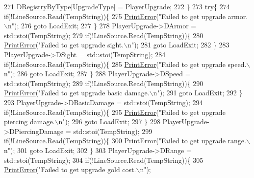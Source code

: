 \begin{DoxyCode}
{271         \hyperlink{classCPlayerUpgrade_a04673f65215501e9eb0ce7828091c30c}{DRegistryByType}[UpgradeType] = PlayerUpgrade;
272     \}
273     \textcolor{keywordflow}{try}\{
274         \textcolor{keywordflow}{if}(!LineSource.Read(TempString))\{
275             \hyperlink{Debug_8h_a2ed825eefefe35baf59a93a8c641323d}{PrintError}(\textcolor{stringliteral}{"Failed to get upgrade armor.\(\backslash\)n"});
276             \textcolor{keywordflow}{goto} LoadExit;
277         \}
278         PlayerUpgrade->DArmor = std::stoi(TempString);
279         \textcolor{keywordflow}{if}(!LineSource.Read(TempString))\{
280             \hyperlink{Debug_8h_a2ed825eefefe35baf59a93a8c641323d}{PrintError}(\textcolor{stringliteral}{"Failed to get upgrade sight.\(\backslash\)n"});
281             \textcolor{keywordflow}{goto} LoadExit;
282         \}
283         PlayerUpgrade->DSight = std::stoi(TempString);
284         \textcolor{keywordflow}{if}(!LineSource.Read(TempString))\{
285             \hyperlink{Debug_8h_a2ed825eefefe35baf59a93a8c641323d}{PrintError}(\textcolor{stringliteral}{"Failed to get upgrade speed.\(\backslash\)n"});
286             \textcolor{keywordflow}{goto} LoadExit;
287         \}
288         PlayerUpgrade->DSpeed = std::stoi(TempString);
289         \textcolor{keywordflow}{if}(!LineSource.Read(TempString))\{
290             \hyperlink{Debug_8h_a2ed825eefefe35baf59a93a8c641323d}{PrintError}(\textcolor{stringliteral}{"Failed to get upgrade basic damage.\(\backslash\)n"});
291             \textcolor{keywordflow}{goto} LoadExit;
292         \}
293         PlayerUpgrade->DBasicDamage = std::stoi(TempString);
294         \textcolor{keywordflow}{if}(!LineSource.Read(TempString))\{
295             \hyperlink{Debug_8h_a2ed825eefefe35baf59a93a8c641323d}{PrintError}(\textcolor{stringliteral}{"Failed to get upgrade piercing damage.\(\backslash\)n"});
296             \textcolor{keywordflow}{goto} LoadExit;
297         \}
298         PlayerUpgrade->DPiercingDamage = std::stoi(TempString);
299         \textcolor{keywordflow}{if}(!LineSource.Read(TempString))\{
300             \hyperlink{Debug_8h_a2ed825eefefe35baf59a93a8c641323d}{PrintError}(\textcolor{stringliteral}{"Failed to get upgrade range.\(\backslash\)n"});
301             \textcolor{keywordflow}{goto} LoadExit;
302         \}
303         PlayerUpgrade->DRange = std::stoi(TempString);
304         \textcolor{keywordflow}{if}(!LineSource.Read(TempString))\{
305             \hyperlink{Debug_8h_a2ed825eefefe35baf59a93a8c641323d}{PrintError}(\textcolor{stringliteral}{"Failed to get upgrade gold cost.\(\backslash\)n"});
}
\end{DoxyCode}
